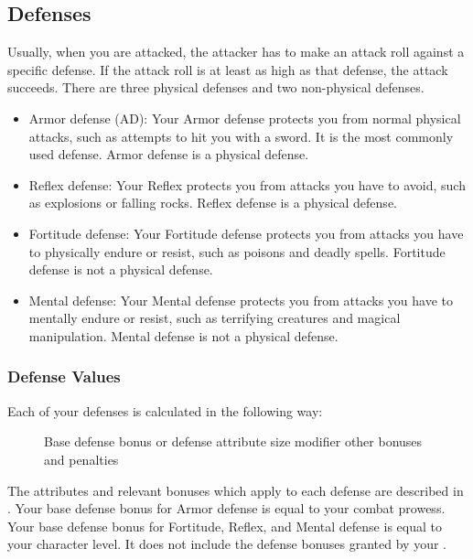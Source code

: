     \subsection{Defenses}\label{Defenses}
        Usually, when you are attacked, the attacker has to make an attack roll against a specific defense.
        If the attack roll is at least as high as that defense, the attack succeeds.
        There are three physical defenses and two non-physical defenses.
        \begin{itemize}
            \item Armor defense (AD): Your Armor defense protects you from normal physical attacks, such as attempts to hit you with a sword.
                It is the most commonly used defense.
                Armor defense is a physical defense.
            \item Reflex defense: Your Reflex protects you from attacks you have to avoid, such as explosions or falling rocks.
                Reflex defense is a physical defense.
            \item Fortitude defense: Your Fortitude defense protects you from attacks you have to physically endure or resist, such as poisons and deadly spells.
                Fortitude defense is not a physical defense.
            \item Mental defense: Your Mental defense protects you from attacks you have to mentally endure or resist, such as terrifying creatures and magical manipulation.
                Mental defense is not a physical defense.
        \end{itemize}

        \subsubsection{Defense Values}\label{Defense Values}

            Each of your defenses is calculated in the following way:

            \begin{figure}[h]
                 \add Base defense bonus or defense attribute \add size modifier \add other bonuses and penalties
            \end{figure}

            The attributes and relevant bonuses which apply to each defense are described in .
            Your base defense bonus for Armor defense is equal to your combat prowess.
            Your base defense bonus for Fortitude, Reflex, and Mental defense is equal to your character level.
            It does not include the defense bonuses granted by your .

